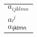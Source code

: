 \documentclass{article}
\makeatletter
\def\@ExpandSub{%
    \typeout{------------- Expanding subscript -------------------}%
    \typeout{Input: \meaning\@input}%
    \typeout{Followup: \meaning\@following}%


    \ifx\@following\UTFviii@three@octets%
        \typeout{>>> That's unicode!}%
    \else%
        \typeout{>>> That's NOT unicode...}%
    \fi%

	\@ifnextchar\UTFviii@three@octets{%
        \typeout{>>> That's unicode!}%
    }{%
        \typeout{>>> That's NOT unicode...}%
    }%

    \iftoggle{insub}{%
        \@input%
    }{%
        \toggletrue{insub}%
        \sb\bgroup\@input%
    }%


	\toggletrue{testingmode}
	\edef\@actual{\expandafter\empty\@following}%
	\typeout{Actual is \meaning\@actual}

	\ifx\@actual\continue@subscript%
        \typeout{ ---- keep going! ----}%
    \else%
        \typeout{ ---- Stop! ---- }%
        \egroup\togglefalse{insub}%
    \fi%
	\togglefalse{testingmode}
}%
\def\continue@subscript{\relax}
\def\sub#1{%
	\iftoggle{testingmode}{%
		\continue@subscript%
	}{%
		\let\@input#1%
		\futurelet\@following\@ExpandSub%
	}%
}%
\newcommand{\needsthree}[3]{#3#2#1}
\makeatother
\begin{document}
\begin{tabular}{l}
$a_{ijklmn}$ \\
$aᵢ^{j}$ \\
$aᵢⱼₖₗₘₙ$
\end{tabular}

%
\end{document}

